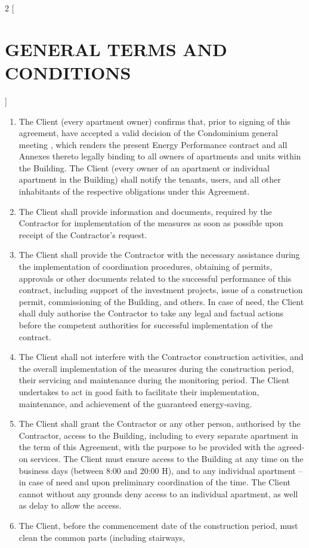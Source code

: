 \begin{multicols}{2} [\section{GENERAL TERMS AND CONDITIONS}]
\begin{enumerate}
  \item The Client (every apartment owner) confirms that, prior to
    signing of this agreement, have accepted a valid decision of the
    Condominium general meeting , which renders the present Energy
    Performance contract and all Annexes thereto legally binding to
    all owners of apartments and units within the Building. The Client
    (every owner of an apartment or individual apartment in the
    Building) shall notify the tenants, users, and all other
    inhabitants of the respective obligations under this Agreement.
  \item The Client shall provide information and documents, required
    by the Contractor for implementation of the measures as soon as
    possible upon receipt of the Contractor’s request.
  \item The Client shall provide the Contractor with the necessary
    assistance during the implementation of coordination procedures,
    obtaining of permits, approvals or other documents related to the
    successful performance of this contract, including support of the
    investment projects, issue of a construction permit, commissioning
    of the Building, and others. In case of need, the Client shall
    duly authorise the Contractor to take any legal and factual
    actions before the competent authorities for successful
    implementation of the contract.
  \item The Client shall not interfere with the Contractor
    construction activities, and the overall implementation of the
    measures during the construction period, their servicing and
    maintenance during the monitoring period. The Client undertakes to
    act in good faith to facilitate their implementation, maintenance,
    and achievement of the guaranteed energy-saving.
  \item The Client shall grant the Contractor or any other person,
    authorised by the Contractor, access to the Building, including to
    every separate apartment in the term of this Agreement, with the
    purpose to be provided with the agreed-on services. The Client
    must ensure access to the Building at any time on the business
    days (between 8:00 and 20:00 H), and to any individual apartment –
    in case of need and upon preliminary coordination of the time. The
    Client cannot without any grounds deny access to an individual
    apartment, as well as delay to allow the access.
  \item The Client, before the commencement date of the construction
    period, must clean the common parts (including stairways,

\end{enumerate}
\end{multicols}
